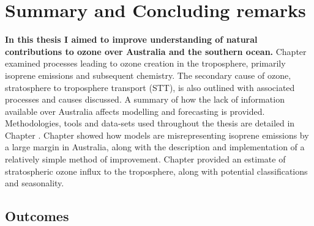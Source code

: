 \chapter{Summary and Concluding remarks} %
\label{Conclusions}

  \textbf{In this thesis I aimed to improve understanding of natural contributions to ozone over Australia and the southern ocean.}
  Chapter  examined processes leading to ozone creation in the troposphere, primarily isoprene emissions and subsequent chemistry.
  The secondary cause of ozone, stratosphere to troposphere transport (STT), is also outlined with associated processes and causes discussed.
  A summary of how the lack of information available over Australia affects modelling and forecasting is provided.
  Methodologies, tools and data-sets used throughout the thesis are detailed in Chapter .
  Chapter  showed how models are misrepresenting isoprene emissions by a large margin in Australia, along with the description and implementation of a relatively simple method of improvement.
  Chapter  provided an estimate of stratospheric ozone influx to the troposphere, along with potential classifications and seasonality.

\section{Outcomes}
\label{Conclusions:aims}
  
